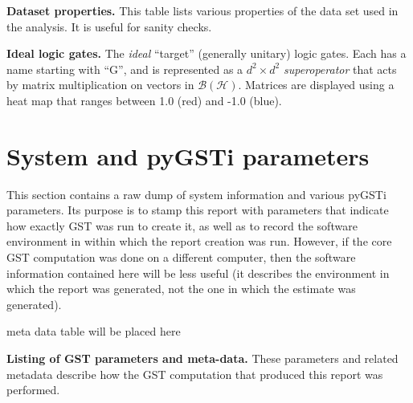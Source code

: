 \documentclass{article}[11pt]
\newcommand{\putfield}[2]{#2}
\begin{document}
\begin{table}[h]
  \begin{center}
    \begin{adjustbox}{max width=\textwidth}
      \putfield{dataset_overview_table}{}
    \end{adjustbox}
    \caption{\textbf{Dataset properties.} This table lists various properties of the data set used in the analysis.  It is useful for sanity checks.}
  \end{center}
\end{table}

\begin{table}[h]
  \begin{center}
    \begin{adjustbox}{max width=\textwidth}
      \putfield{target_gates_box_table}{}
    \end{adjustbox}
    \caption{\textbf{Ideal logic gates.} The \emph{ideal} ``target'' (generally unitary) logic gates.  Each has a name starting with ``G'', and is represented as a $d^2\times d^2$ \emph{superoperator} that acts by matrix multiplication on vectors in $\mathcal{B}(\mathcal{H})$.  Matrices are displayed using a heat map that ranges between 1.0 (red) and -1.0 (blue).}
  \end{center}
\end{table}


\section{System and pyGSTi parameters\label{metadata}}
This section contains a raw dump of system information and various pyGSTi parameters.  Its purpose is to stamp this report with parameters that indicate how exactly GST was run to create it, as well as to record the software environment in within which the report creation was run.  However, if the core GST computation was done on a different computer, then the software information contained here will be less useful (it describes the environment in which the report was generated, not the one in which the estimate was generated).

\begin{table}[h]
  \begin{center}
    \begin{adjustbox}{max width=\textwidth}
      \putfield{metadata_table}{meta data table will be placed here}
    \end{adjustbox}
    \caption{\textbf{Listing of GST parameters and meta-data.}  These parameters and related metadata describe how the GST computation that produced this report was performed. \label{metadata_table}}
  \end{center}
\end{table}
\end{document}
